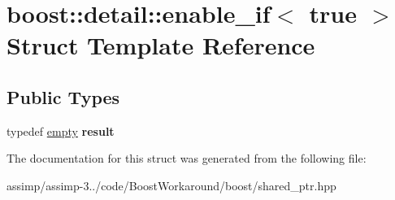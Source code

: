 \hypertarget{structboost_1_1detail_1_1enable__if_3_01true_01_4}{\section{boost\+:\+:detail\+:\+:enable\+\_\+if$<$ true $>$ Struct Template Reference}
\label{structboost_1_1detail_1_1enable__if_3_01true_01_4}
}
\subsection*{Public Types}
\begin{DoxyCompactItemize}
\item 
\hypertarget{structboost_1_1detail_1_1enable__if_3_01true_01_4_a8c34b238d862731adf859a4f9b1bcae1}{typedef \hyperlink{structboost_1_1detail_1_1empty}{empty} {\bfseries result}}\label{structboost_1_1detail_1_1enable__if_3_01true_01_4_a8c34b238d862731adf859a4f9b1bcae1}

\end{DoxyCompactItemize}


The documentation for this struct was generated from the following file\+:\begin{DoxyCompactItemize}
\item 
assimp/assimp-\/3../code/\+Boost\+Workaround/boost/shared\+\_\+ptr.\+hpp\end{DoxyCompactItemize}
